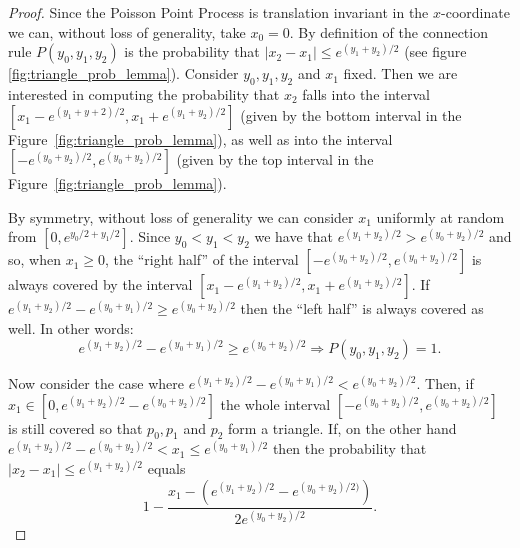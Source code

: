 \begin{proof}
Since the Poisson Point Process is translation invariant in the $x$-coordinate we can, without loss of generality, take $x_0 = 0$. By definition of the connection rule $P(y_0,y_1,y_2)$ is the probability that $|x_2-x_1| \leq  e^{(y_1+y_2)/2}$ (see figure \ref{fig:triangle_prob_lemma}). Consider $y_0, y_1, y_2$ and $x_1$ fixed. Then we are interested in computing the probability that $x_2$ falls into the interval $[x_1-e^{(y_1+y+2)/2},x_1+e^{(y_1+y_2)/2}]$ (given by the bottom interval in the Figure~\ref{fig:triangle_prob_lemma}), as well as into the interval $[-e^{(y_0+y_2)/2},e^{(y_0+y_2)/2}]$ (given by the top interval in the Figure~\ref{fig:triangle_prob_lemma}).

%

By symmetry, without loss of generality we can consider $x_1$ uniformly at random from $[0,e^{y_0/2+y_1/2}]$. 
Since $y_0 < y_1 < y_2$ we have that $e^{(y_1+y_2)/2} > e^{(y_0+y_2)/2}$ and so, when $x_1 \geq 0$, the ``right half'' of the interval $[-e^{(y_0+y_2)/2}, e^{(y_0+y_2)/2}]$ is always covered by the interval $[x_1-e^{(y_1+y_2)/2}, x_1+e^{(y_1+y_2)/2}]$.
If $e^{(y_1+y_2)/2} - e^{(y_0+y_1)/2} \geq e^{(y_0+y_2)/2}$ then the ``left half'' is always covered as well.
In other words:
\[
	e^{(y_1+y_2)/2} - e^{(y_0+y_1)/2} \geq e^{(y_0+y_2)/2} \Rightarrow P(y_0,y_1,y_2) = 1.
\]

Now consider the case where $e^{(y_1+y_2)/2} - e^{(y_0+y_1)/2} < e^{(y_0+y_2)/2}$. Then, if $x_1 \in [0, e^{(y_1+y_2)/2} - e^{(y_0+y_2)/2}]$ the whole interval $[-e^{(y_0+y_2)/2}, e^{(y_0+y_2)/2}]$ is still covered so that $p_0, p_1$ and $p_2$ form a triangle. If, on the other hand $e^{(y_1+y_2)/2} - e^{(y_0+y_2)/2} < x_1 \leq e^{(y_0+y_1)/2}$ then
the probability that $|x_2-x_1| \leq e^{(y_1+y_2)/2}$ equals
\[ 
	1 - \frac{x_1 - (e^{(y_1+y_2)/2} - e^{(y_0+y_2)/2)}) }{ 2e^{(y_0+y_2)/2} }. 
\]


\end{proof}
